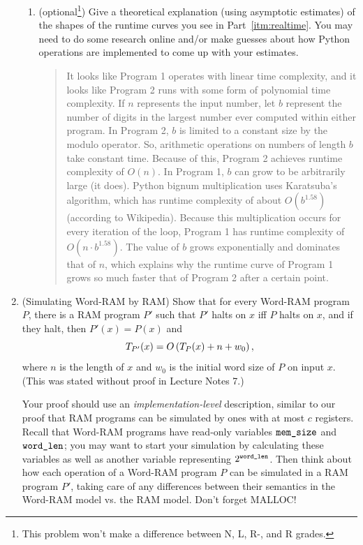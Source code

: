 \documentclass[11pt]{article}
\begin{document}
\begin{enumerate}
\begin{enumerate}
    
    \item (optional\footnote{This problem won't make a difference between N, L, R-, and R grades.}) Give a theoretical explanation (using asymptotic estimates) of the shapes of the runtime curves you see in Part~\ref{itm:realtime}. You may need to do some research online and/or make guesses about how Python operations are implemented to come up with your estimates. 
    \begin{quote}
        \color{purple}
        It looks like Program 1 operates with linear time complexity, and it looks like Program 2 runs with some form of polynomial time complexity. \newline 
        If $n$ represents the input number, let $b$ represent the number of digits in the largest number ever computed within either program. In Program 2, $b$ is limited to a constant size by the modulo operator. So, arithmetic operations on numbers of length $b$ take constant time. Because of this, Program 2 achieves runtime complexity of $O(n)$. \newline 
        In Program 1, $b$ can grow to be arbitrarily large (it does). Python bignum multiplication uses Karatsuba's algorithm, which has runtime complexity of about $O(b^{1.58})$ (according to Wikipedia). Because this multiplication occurs for every iteration of the loop, Program 1 has runtime complexity of $O(n \cdot b^{1.58})$. The value of $b$ grows exponentially and dominates that of $n$, which explains why the runtime curve of Program 1 grows so much faster that of Program 2 after a certain point.
    \end{quote}
\end{enumerate}

\item (Simulating Word-RAM by RAM)  Show that for every Word-RAM program $P$, there is a RAM program $P'$ such that $P'$ halts on $x$ iff $P$ halts on $x$, and if they halt, then  $P'(x)=P(x)$ and 
       $$T_{P'}(x) = O\left(T_P(x)+n+w_0\right),$$
where $n$ is the length of $x$ and $w_0$ is the initial word size of $P$ on input $x$.  (This was stated without proof in Lecture Notes 7.) 

Your proof should use an {\em implementation-level} description, similar to our proof that RAM programs can be simulated by ones with at most $c$ registers.  Recall that Word-RAM programs have read-only variables $\texttt{mem\_size}$ and $\texttt{word\_len}$; you may want to start your simulation by calculating these variables as well as another variable representing $2^{\texttt{word\_len}}$.  Then think about how each operation of a Word-RAM program $P$ can be simulated in a RAM program $P'$, taking care of any differences between their semantics in the Word-RAM model vs. the RAM model. Don't forget MALLOC!


\end{enumerate}
\end{document}
